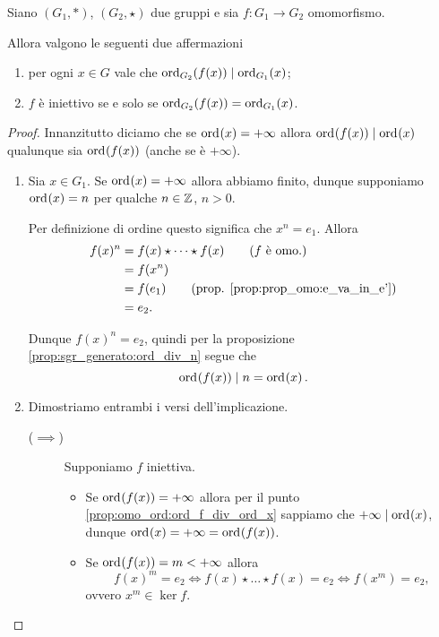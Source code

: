 \begin{proposition}
    \label{prop:omo_ord}
    Siano $(G_1, *)$, $(G_2, \star)$ due gruppi e sia $f : G_1 \to G_2$ omomorfismo.

    Allora valgono le seguenti due affermazioni \begin{enumerate}[label={(\roman*)}, ref={\theproposition: (\roman*)}]
        \item \label{prop:omo_ord:ord_f_div_ord_x} per ogni $x \in G$ vale che $\ord[G_2]{f(x)} \divides \ord[G_1]{x}$;
        \item \label{prop:omo_ord:inj_sse_ord_f=ord_x} $f$ è iniettivo se e solo se $\ord[G_2]{f(x)} = \ord[G_1]{x}$.
    \end{enumerate}
\end{proposition}
\begin{proof}
    Innanzitutto diciamo che se $\ord x = +\infty$ allora $\ord{f(x)} \divides \ord{x}$ qualunque sia $\ord{f(x)}$ (anche se è $+\infty$).

    \begin{enumerate}[label={(\roman*)}]
        \item Sia $x \in G_1$. Se $\ord x = +\infty$ allora abbiamo finito, dunque supponiamo $\ord x = n$ per qualche $n \in \Z$, $n > 0$.
        
        Per definizione di ordine questo significa che $x^n = e_1$.
        Allora \begin{align*}
            f(x)^n &= f(x) \star \cdots \star f(x) \tag{$f$ è omo.}\\
            &= f(x^n) \\
            &= f(e_1) \tag{prop. \ref{prop:prop_omo:e_va_in_e'}}\\
            &= e_2.
        \end{align*}

        Dunque $f(x)^n = e_2$, quindi per la proposizione \ref{prop:sgr_generato:ord_div_n} segue che \[
            \ord{f(x)} \divides n = \ord x.    
        \]
        \item Dimostriamo entrambi i versi dell'implicazione.
        \begin{description}
            \item[($\implies$)] Supponiamo $f$ iniettiva. \begin{itemize}
                \item Se $\ord{f(x)} = +\infty$ allora per il punto \ref{prop:omo_ord:ord_f_div_ord_x} sappiamo che $+\infty \divides \ord x$, dunque $\ord x = +\infty = \ord{f(x)}$.
                \item Se $\ord{f(x)} = m < +\infty$ allora \[
                    f(x)^m = e_2 \iff f(x) \star \dots \star f(x) = e_2 \iff f(x^m) = e_2,    
                \] ovvero $x^m \in \ker f$.


\end{itemize}
\end{description}
\end{enumerate}
\end{proof}
